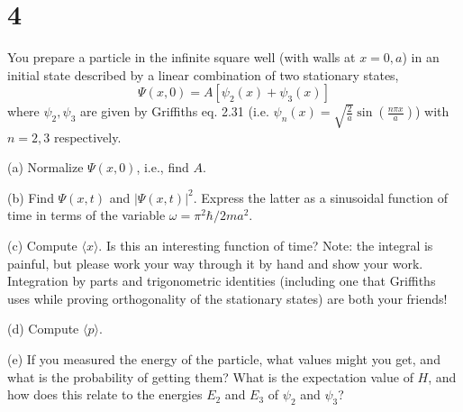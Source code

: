 \documentclass{article}
\begin{document}
\newpage

\section*{4}
\begin{ques}\label{q4}
You prepare a particle in the infinite square well (with walls at $x = 0, a$) in an initial state
described by a linear combination of two stationary states,
\[
\Psi(x, 0) = A[\psi_2(x) + \psi_3(x)]
\]
where $\psi_2, \psi_3$ are given by Griffiths eq. 2.31 (i.e. $\psi_n(x) = \sqrt{\frac{2}{a}}\sin\left(\frac{n\pi x}{a}\right)$) with $n = 2, 3$
respectively.

(a) Normalize $\Psi(x, 0)$, i.e., find $A$.

(b) Find $\Psi(x, t)$ and $|\Psi(x, t)|^2$. Express the latter as a sinusoidal function of time in
terms of the variable $\omega = \pi^2\hbar / 2ma^2$.

(c) Compute $\langle x \rangle$. Is this an interesting function of time? Note: the integral is painful,
but please work your way through it by hand and show your work. Integration by
parts and trigonometric identities (including one that Griffiths uses while proving
orthogonality of the stationary states) are both your friends!

(d) Compute $\langle p \rangle$.

(e) If you measured the energy of the particle, what values might you get, and what is
the probability of getting them? What is the expectation value of $H$, and how does
this relate to the energies $E_2$ and $E_3$ of $\psi_2$ and $\psi_3$?
\end{ques}
\end{document}
